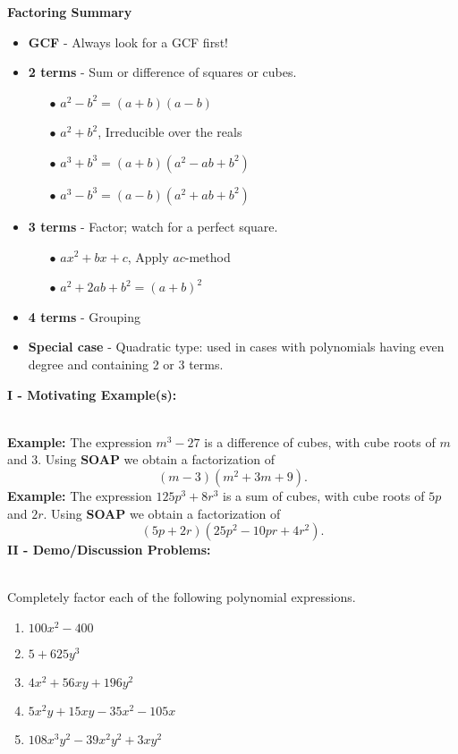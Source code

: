 \documentclass[12pt]{article}
\theoremstyle{definition}
\begin{document}
\begin{center}
  {\bf Factoring Summary}
\end{center}
\begin{itemize}
	\item {\bf GCF} - Always look for a GCF first!
  \item {\bf 2 terms} - Sum or difference of squares or cubes.
		\begin{itemize}
			\item[$\bullet$] $ a^2 - b^2 = (a + b) (a - b)$
			\item[$\bullet$] $a^2 + b^2$, Irreducible over the reals
			\item[$\bullet$] $a^3 + b^3 = (a + b) (a^2 - a b + b^2)$ 
			\item[$\bullet$] $a^3 - b^3 = (a - b) (a^2 + ab + b^2)$
		\end{itemize}
  \item {\bf 3 terms} - Factor; watch for a perfect square.
		\begin{itemize}
			\item[$\bullet$] $ax^2+bx+c$, Apply $ac$-method
			\item[$\bullet$] $a^2 + 2 a b + b^2 = (a + b)^2$
		\end{itemize}
	\item {\bf 4 terms} - Grouping
	\item {\bf Special case} - Quadratic type: used in cases with polynomials having even degree and containing 2 or 3 terms.
\end{itemize}
{\bf I - Motivating Example(s):}\\
\ \par
{\bf Example:} The expression $m^3 - 27$ is a difference of cubes, with cube roots of $m$ and $3$.  Using {\bf SOAP} we obtain a factorization of $$(m - 3) (m^2 + 3 m + 9).$$
{\bf Example:} The expression $125 p^3 + 8 r^3$ is a sum of cubes, with cube roots of $5p$ and $2r$.  Using {\bf SOAP} we obtain a factorization of $$(5 p + 2 r) (25 p^2 - 10 pr + 4 r^2).$$
\newpage
{\bf II - Demo/Discussion Problems:}\\
\ \par
Completely factor each of the following polynomial expressions.
\begin{enumerate}
	\item $100 x^2 - 400$
	\item $5 + 625 y^3$
	\item $4 x^2 + 56 x y + 196 y^2$
	\item $5 x^2 y + 15 x y - 35 x^2 - 105 x$
	\item $108 x^3 y^2 - 39 x^2 y^2 + 3 x y^2$
\end{enumerate}	
\end{document}

